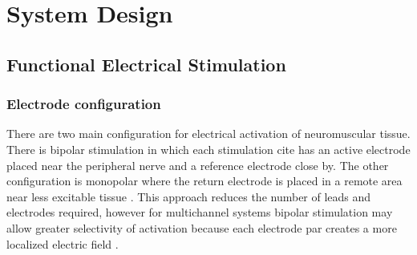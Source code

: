 
\section{System Design}

\subsection{Functional Electrical Stimulation}

\subsubsection{Electrode configuration}
There are two main configuration for electrical activation of neuromuscular tissue. There is bipolar stimulation in which each stimulation cite has an active electrode placed near the peripheral nerve and a reference electrode close by. The other configuration is monopolar where the return electrode is placed in a remote area near less excitable tissue \cite{peckham_functional_2005}. 
This approach reduces the number of leads and electrodes required, however for multichannel systems bipolar stimulation may allow greater selectivity of activation because each electrode par creates a more localized electric field \cite{grandjean_recruitment_1986}. 

